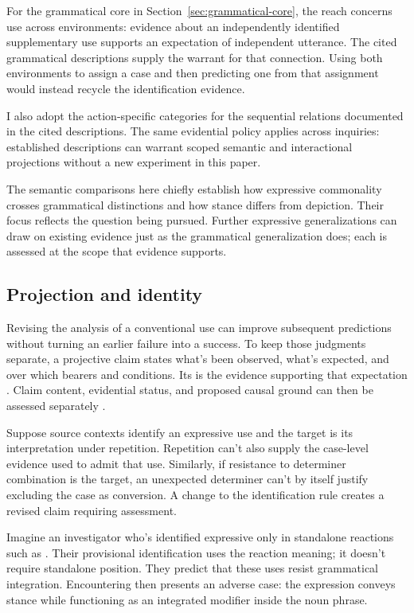 \documentclass[12pt]{article}
\begin{document}
For the grammatical core in Section~\ref{sec:grammatical-core}, the reach
concerns use across environments: evidence about an independently identified
supplementary use supports an expectation of independent utterance.
The cited grammatical descriptions supply the warrant for that connection.
Using both environments to assign a case and then predicting one
from that assignment would instead recycle the identification evidence.

I also adopt the action-specific categories for the sequential relations
documented in the cited descriptions. The same evidential policy applies
across inquiries: established descriptions can warrant scoped semantic and
interactional projections without a new experiment in this paper.

The semantic comparisons here chiefly establish how expressive commonality
crosses grammatical distinctions and how stance differs from depiction.
Their focus reflects the question being pursued. Further expressive
generalizations can draw on existing evidence just as the grammatical
generalization does; each is assessed at the scope that evidence supports.

\subsection{Projection and identity}

Revising the analysis of a conventional use can improve subsequent
predictions without turning an earlier failure into a success. To
keep those judgments separate, a projective claim states what's been
observed, what's expected, and over which bearers and conditions.
Its  is the evidence supporting that expectation
\citep{Goodman1955}. Claim content, evidential status, and proposed causal
ground can then be assessed separately
\citep[11--12]{reynolds2026projectibilityHistory}.

Suppose source contexts identify an expressive use and the target is
its interpretation under repetition. Repetition can't also supply the
case-level evidence used to admit that use. Similarly, if resistance
to determiner combination is the target, an unexpected determiner
can't by itself justify excluding the case as conversion. A change
to the identification rule creates a revised claim requiring assessment.

Imagine an investigator who's identified expressive 
only in standalone reactions such as . Their provisional identification uses the reaction meaning;
it doesn't require standalone position. They predict that these uses
resist grammatical integration. Encountering  then presents an adverse case: the expression conveys stance
while functioning as an integrated modifier inside the noun phrase.
\end{document}
